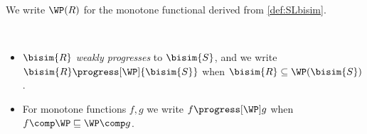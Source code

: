 
\begin{definition} \label{def:wp} %
  We write $\WP(R)$ for the monotone functional derived from \cref{def:SLbisim}.
%
\end{definition} %
\begin{definition}\label{def:progression} %
  ~
  \begin{itemize}
    \item %
      $\bisim{R}$ \emph{weakly progresses} to $\bisim{S}$, and we write 
      ${\bisim{R}}\progress[\WP]{\bisim{S}}$ when ${\bisim{R}}\subseteq\WP(\bisim{S})$.

    \item For monotone functions %
      $f, g$ %
    we write $f \progress[\WP] g$ 
      when $f\comp\WP \sqsubseteq \WP\comp g$.
  \end{itemize}
\end{definition} %

